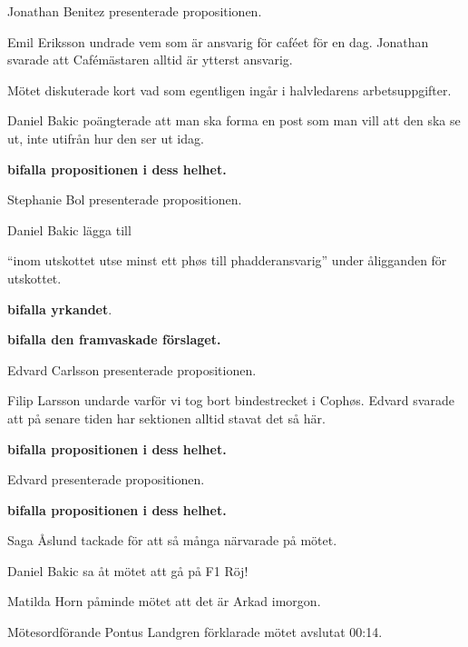 \documentclass[10pt]{article}
\def\mo{Pontus Landgren}
\begin{document}
\begin{paragrafer}
\begin{paragrafer}
      Jonathan Benitez presenterade propositionen. 

      Emil Eriksson undrade vem som är ansvarig för caféet för en dag. Jonathan svarade att Cafémästaren alltid är ytterst ansvarig.

      Mötet diskuterade kort vad som egentligen ingår i halvledarens arbetsuppgifter. 

      Daniel Bakic poängterade att man ska forma en post som man vill att den ska se ut, inte utifrån hur den ser ut idag. 

      \textbf{\Mba bifalla propositionen i dess helhet.}


      Stephanie Bol presenterade propositionen.

      Daniel Bakic \ypa lägga till
      \begin{dashlist}
        \item ``inom utskottet utse minst ett phøs till phadderansvarig'' under åligganden för utskottet. 
      \end{dashlist}
    
      \textbf{\Mba bifalla yrkandet}.

      \textbf{\Mba bifalla den framvaskade förslaget.}


      Edvard Carlsson presenterade propositionen. 


      Filip Larsson undarde varför vi tog bort bindestrecket i Cophøs. Edvard svarade att på senare tiden har sektionen alltid stavat det så här.

      \textbf{\Mba bifalla propositionen i dess helhet.}


      Edvard presenterade propositionen. 

      \textbf{\Mba bifalla propositionen i dess helhet.}
      
    \end{paragrafer}

Saga Åslund tackade för att så många närvarade på mötet. 

Daniel Bakic sa åt mötet att gå på F1 Röj!

Matilda Horn påminde mötet att det är Arkad imorgon.

Mötesordförande {\mo} förklarade mötet avslutat 00:14.

\end{paragrafer}
\end{document}
